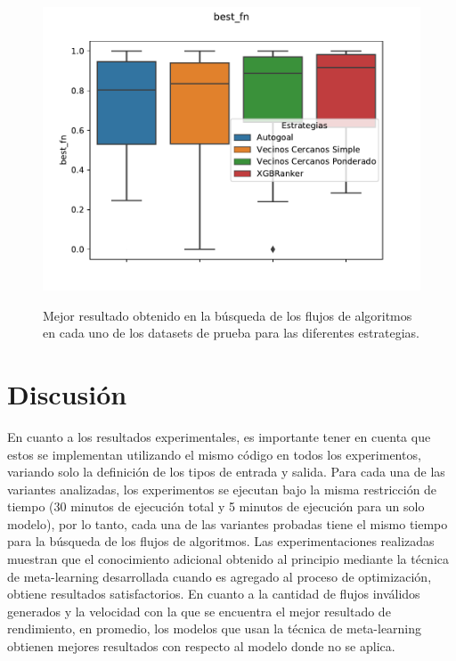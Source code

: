 \begin{figure}[H]
\centering
\includegraphics[scale=.75]{Figures/best fn.pdf}
\label{fig:bestfn}
\caption{Mejor resultado obtenido en la búsqueda de los flujos de algoritmos en cada uno de los datasets de prueba para las diferentes estrategias.}
\end{figure}

\section{Discusión}\label{sec:discusion}

%
%
%	
%	
%	

En cuanto a los resultados experimentales, es importante tener en cuenta que estos se implementan utilizando el mismo código en todos los experimentos, variando solo la definición de los tipos de entrada y salida. Para cada una de las variantes analizadas, los experimentos se ejecutan bajo la misma restricción de tiempo (30 minutos de ejecución total y 5 minutos de ejecución para un solo modelo), por lo tanto, cada una de las variantes probadas tiene el mismo tiempo para la búsqueda de los flujos de algoritmos. Las experimentaciones realizadas muestran que el conocimiento adicional obtenido al principio mediante la técnica de meta-learning desarrollada cuando es agregado al proceso de optimización, obtiene resultados satisfactorios. En cuanto a la cantidad de flujos inválidos generados y la velocidad con la que se encuentra el mejor resultado de rendimiento, en promedio, los modelos que usan la técnica de meta-learning obtienen mejores resultados con respecto al modelo donde no se aplica.

